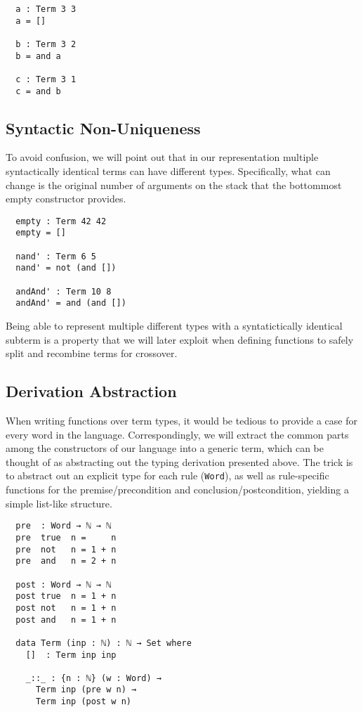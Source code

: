 \documentclass[runningheads,a4paper]{llncs}
\begin{document}
\begin{verbatim}
  a : Term 3 3
  a = []

  b : Term 3 2
  b = and a

  c : Term 3 1
  c = and b
\end{verbatim}

\subsection{Syntactic Non-Uniqueness}

To avoid confusion, we will point out that in our representation
multiple syntactically identical terms can have different
types. Specifically, what can change is the original number of
arguments on the stack that the bottommost empty constructor provides.

\begin{verbatim}
  empty : Term 42 42
  empty = []

  nand' : Term 6 5
  nand' = not (and [])

  andAnd' : Term 10 8
  andAnd' = and (and [])
\end{verbatim}

Being able to represent multiple different types with a
syntatictically identical subterm is a property that we will later
exploit when defining functions to safely split and recombine terms
for crossover.

\subsection{Derivation Abstraction}

When writing functions over term types, it would be tedious to provide
a case for every word in the language. Correspondingly, we will
extract the common parts among the constructors of our language into a
generic term, which can be thought of as abstracting out the typing
derivation presented above. The trick is to abstract out an explicit
type for each rule (\texttt{Word}), as well as rule-specific functions
for the premise/precondition and conclusion/postcondition, yielding a
simple list-like structure.

\begin{verbatim}
  pre  : Word → ℕ → ℕ
  pre  true  n =     n
  pre  not   n = 1 + n
  pre  and   n = 2 + n

  post : Word → ℕ → ℕ
  post true  n = 1 + n
  post not   n = 1 + n
  post and   n = 1 + n

  data Term (inp : ℕ) : ℕ → Set where
    []  : Term inp inp

    _::_ : {n : ℕ} (w : Word) →
      Term inp (pre w n) →
      Term inp (post w n)
\end{verbatim}
\end{document}
